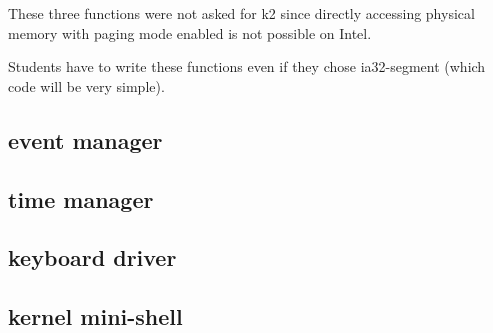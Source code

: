 These three functions  were not asked for k2  since directly accessing
physical memory with paging mode enabled is not possible on Intel.

Students have to write these functions even if they chose ia32-segment
(which code will be very simple).

\subsection{event manager}

\subsection{time manager}

\subsection{keyboard driver}

\subsection{kernel mini-shell}

